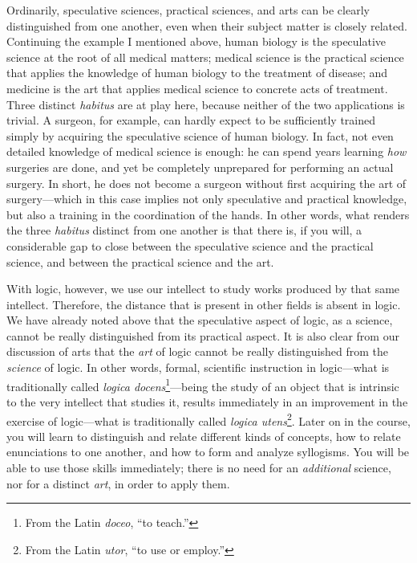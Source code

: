 \documentclass[
  12pt,
]{memoir}
\begin{document}
Ordinarily, speculative sciences, practical sciences, and arts can be
clearly distinguished from one another, even when their subject matter
is closely related. Continuing the example I mentioned above, human
biology is the speculative science at the root of all medical matters;
medical science is the practical science that applies the knowledge of
human biology to the treatment of disease; and medicine is the art that
applies medical science to concrete acts of treatment. Three distinct
\emph{habitus} are at play here, because neither of the two applications
is trivial. A surgeon, for example, can hardly expect to be sufficiently
trained simply by acquiring the speculative science of human biology. In
fact, not even detailed knowledge of medical science is enough: he can
spend years learning \emph{how} surgeries are done, and yet be
completely unprepared for performing an actual surgery. In short, he
does not become a surgeon without first acquiring the art of
surgery---which in this case implies not only speculative and practical
knowledge, but also a training in the coordination of the hands. In
other words, what renders the three \emph{habitus} distinct from one
another is that there is, if you will, a considerable gap to close
between the speculative science and the practical science, and between
the practical science and the art.

With logic, however, we use our intellect to study works produced by
that same intellect. Therefore, the distance that is present in other
fields is absent in logic. We have already noted above that the
speculative aspect of logic, as a science, cannot be really
distinguished from its practical aspect. It is also clear from our
discussion of arts that the \emph{art} of logic cannot be really
distinguished from the \emph{science} of logic. In other words, formal,
scientific instruction in logic---what is traditionally called
\emph{logica docens}\footnote{From the Latin \emph{doceo}, ``to teach.''}---being
the study of an object that is intrinsic to the very intellect that
studies it, results immediately in an improvement in the exercise of
logic---what is traditionally called \emph{logica utens}\footnote{From
  the Latin \emph{utor}, ``to use or employ.''}. Later on in the course,
you will learn to distinguish and relate different kinds of concepts,
how to relate enunciations to one another, and how to form and analyze
syllogisms. You will be able to use those skills immediately; there is
no need for an \emph{additional} science, nor for a distinct \emph{art},
in order to apply them.
\end{document}
